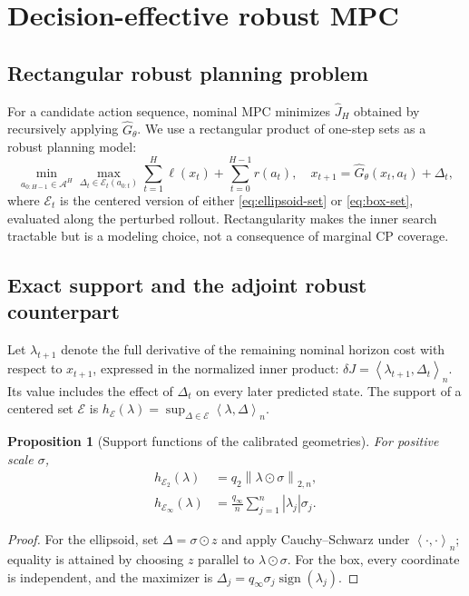 \documentclass[10pt]{article}
\newtheorem{proposition}{Proposition}
\newcommand{\ip}[2]{\left\langle #1,#2\right\rangle_n}
\newcommand{\normn}[1]{\left\lVert #1\right\rVert_{2,n}}
\begin{document}
\section{Decision-effective robust MPC}

\subsection{Rectangular robust planning problem}

For a candidate action sequence, nominal MPC minimizes
$\widehat J_H$ obtained by recursively applying $\widehat G_\theta$. We use a
rectangular product of one-step sets as a robust planning model:
\begin{equation}
\min_{a_{0:H-1}\in\mathcal A^H}
\max_{\Delta_t\in\mathcal E_t(a_{0:t})}
\sum_{t=1}^{H}\ell(x_t)+\sum_{t=0}^{H-1}r(a_t),
\quad
x_{t+1}=\widehat G_\theta(x_t,a_t)+\Delta_t,
\label{eq:minmax-mpc}
\end{equation}
where $\mathcal E_t$ is the centered version of either
\cref{eq:ellipsoid-set} or \cref{eq:box-set}, evaluated along the perturbed
rollout. Rectangularity makes the inner search tractable but is a modeling
choice, not a consequence of marginal CP coverage.

\subsection{Exact support and the adjoint robust counterpart}

Let $\lambda_{t+1}$ denote the full derivative of the remaining nominal
horizon cost with respect to $x_{t+1}$, expressed in the normalized inner
product: $\delta J=\ip{\lambda_{t+1}}{\Delta_t}$. Its value includes the
effect of $\Delta_t$ on every later predicted state. The support of a centered
set $\mathcal E$ is
$h_{\mathcal E}(\lambda)=\sup_{\Delta\in\mathcal E}\ip{\lambda}{\Delta}$.

\begin{proposition}[Support functions of the calibrated geometries]
For positive scale $\sigma$,
\begin{align}
h_{\mathcal E_2}(\lambda)
&=q_2\normn{\lambda\odot\sigma},
\label{eq:ell-support}\\
h_{\mathcal E_\infty}(\lambda)
&=\frac{q_\infty}{n}\sum_{j=1}^{n}|\lambda_j|\sigma_j.
\label{eq:box-support}
\end{align}
\end{proposition}
\begin{proof}
For the ellipsoid, set $\Delta=\sigma\odot z$ and apply Cauchy--Schwarz
under $\ip{\cdot}{\cdot}$; equality is attained by choosing $z$ parallel to
$\lambda\odot\sigma$. For the box, every coordinate is independent, and the
maximizer is $\Delta_j=q_\infty\sigma_j\operatorname{sign}(\lambda_j)$.
\end{proof}
\end{document}
